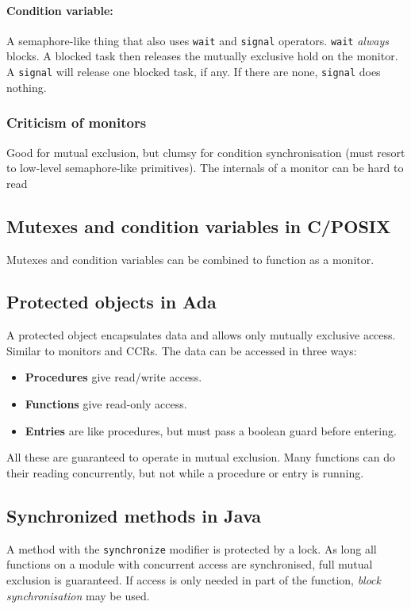 \documentclass[a4paper, 12pt]{article}
\begin{document}
\paragraph{Condition variable:} A semaphore-like thing that also uses \texttt{wait} and \texttt{signal} operators. \texttt{wait} \emph{always} blocks. A blocked task then releases the mutually exclusive hold on the monitor. A \texttt{signal} will release one blocked task, if any. If there are none, \texttt{signal} does nothing.
\subsubsection{Criticism of monitors}
Good for mutual exclusion, but clumsy for condition synchronisation (must resort to low-level semaphore-like primitives). The internals of a monitor can be hard to read

\subsection{Mutexes and condition variables in C/POSIX}
Mutexes and condition variables can be combined to function as a monitor.

\subsection{Protected objects in Ada}
A protected object encapsulates data and allows only mutually exclusive access. Similar to monitors and CCRs. The data can be accessed in three ways:
\begin{itemize}
	\item \textbf{Procedures} give read/write access.
	\item \textbf{Functions} give read-only access.
	\item \textbf{Entries} are like procedures, but must pass a boolean guard before entering.
\end{itemize}
All these are guaranteed to operate in mutual exclusion. Many functions can do their reading concurrently, but not while a procedure or entry is running.

\subsection{Synchronized methods in Java}
A method with the \texttt{synchronize} modifier is protected by a lock. As long all functions on a module with concurrent access are synchronised, full mutual exclusion is guaranteed. If access is only needed in part of the function, \emph{block synchronisation} may be used.
\end{document}
